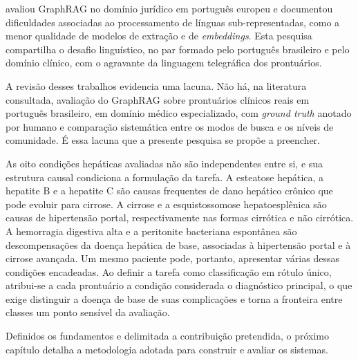 \citet{esteves2025} avaliou GraphRAG no domínio jurídico em português europeu e documentou dificuldades associadas ao processamento de línguas sub-representadas, como a menor qualidade de modelos de extração e de \textit{embeddings}. Esta pesquisa compartilha o desafio linguístico, no par formado pelo português brasileiro e pelo domínio clínico, com o agravante da linguagem telegráfica dos prontuários.

A revisão desses trabalhos evidencia uma lacuna. Não há, na literatura consultada, avaliação do GraphRAG sobre prontuários clínicos reais em português brasileiro, em domínio médico especializado, com \textit{ground truth} anotado por humano e comparação sistemática entre os modos de busca e os níveis de comunidade. É essa lacuna que a presente pesquisa se propõe a preencher.

As oito condições hepáticas avaliadas não são independentes entre si, e sua estrutura causal condiciona a formulação da tarefa. A esteatose hepática, a hepatite B e a hepatite C são causas frequentes de dano hepático crônico que pode evoluir para cirrose. A cirrose e a esquistossomose hepatoesplênica são causas de hipertensão portal, respectivamente nas formas cirrótica e não cirrótica. A hemorragia digestiva alta e a peritonite bacteriana espontânea são descompensações da doença hepática de base, associadas à hipertensão portal e à cirrose avançada. Um mesmo paciente pode, portanto, apresentar várias dessas condições encadeadas. Ao definir a tarefa como classificação em rótulo único, atribui-se a cada prontuário a condição considerada o diagnóstico principal, o que exige distinguir a doença de base de suas complicações e torna a fronteira entre classes um ponto sensível da avaliação.

Definidos os fundamentos e delimitada a contribuição pretendida, o próximo capítulo detalha a metodologia adotada para construir e avaliar os sistemas.
